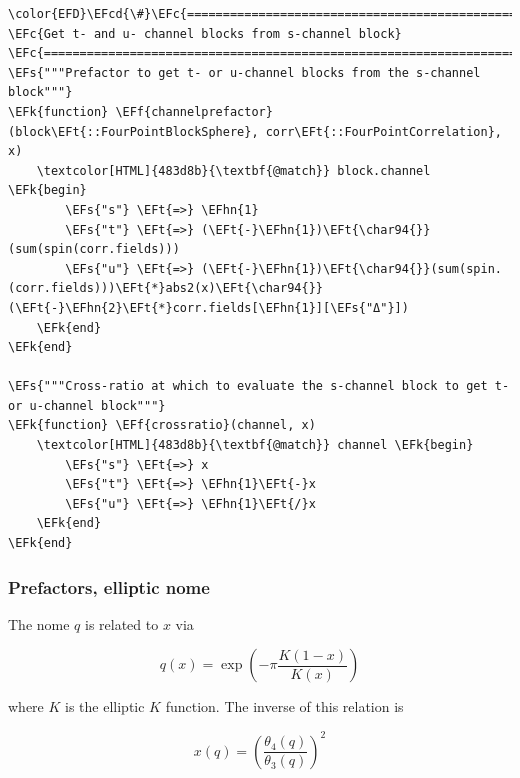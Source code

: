 \documentclass[a4paper]{article}
\numberwithin{equation}{section}
\newcommand{\EFc}[1]{\textcolor{EFc}{#1}} %
\newcommand{\EFcd}[1]{\textcolor{EFcd}{#1}} %
\newcommand{\EFs}[1]{\textcolor{EFs}{#1}} %
\newcommand{\EFk}[1]{\textcolor{EFk}{#1}} %
\newcommand{\EFf}[1]{\textcolor{EFf}{#1}} %
\newcommand{\EFt}[1]{\textcolor{EFt}{#1}} %
\newcommand{\EFhn}[1]{\textcolor{EFhn}{#1}} %
\begin{document}
\begin{Code}
\begin{Verbatim}
\color{EFD}\EFcd{\#}\EFc{===========================================================================================}
\EFc{Get t- and u- channel blocks from s-channel block}
\EFc{===========================================================================================\#}
\EFs{"""Prefactor to get t- or u-channel blocks from the s-channel block"""}
\EFk{function} \EFf{channelprefactor}(block\EFt{::FourPointBlockSphere}, corr\EFt{::FourPointCorrelation}, x)
    \textcolor[HTML]{483d8b}{\textbf{@match}} block.channel \EFk{begin}
        \EFs{"s"} \EFt{=>} \EFhn{1}
        \EFs{"t"} \EFt{=>} (\EFt{-}\EFhn{1})\EFt{\char94{}}(sum(spin(corr.fields)))
        \EFs{"u"} \EFt{=>} (\EFt{-}\EFhn{1})\EFt{\char94{}}(sum(spin.(corr.fields)))\EFt{*}abs2(x)\EFt{\char94{}}(\EFt{-}\EFhn{2}\EFt{*}corr.fields[\EFhn{1}][\EFs{"Δ"}])
    \EFk{end}
\EFk{end}

\EFs{"""Cross-ratio at which to evaluate the s-channel block to get t- or u-channel block"""}
\EFk{function} \EFf{crossratio}(channel, x)
    \textcolor[HTML]{483d8b}{\textbf{@match}} channel \EFk{begin}
        \EFs{"s"} \EFt{=>} x
        \EFs{"t"} \EFt{=>} \EFhn{1}\EFt{-}x
        \EFs{"u"} \EFt{=>} \EFhn{1}\EFt{/}x
    \EFk{end}
\EFk{end}
\end{Verbatim}
\end{Code}
\subsubsection*{Prefactors, elliptic nome}
\label{sec:org8601cfc}

The nome \(q\) is related to \(x\) via

\[
q(x) = \exp(-\pi \frac{K(1-x)}{K(x)})
\]

where \(K\) is the elliptic \(K\) function. The inverse of this relation is

\[
x(q) = \left(\frac{\theta_{4}(q)}{\theta_{3}(q)}\right)^{2}
\]
\end{document}
